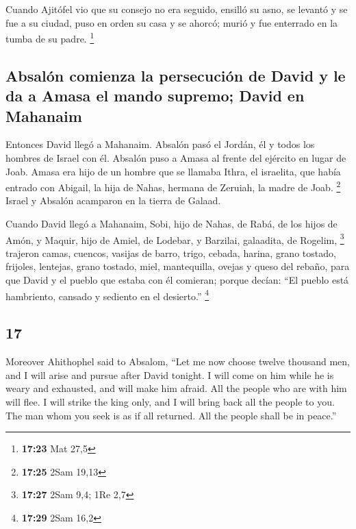\begin{paracol}{2}
 Cuando Ajitófel vio que su consejo no era seguido,
ensilló su asno, se levantó y se fue a su ciudad, puso en orden su casa
y se ahorcó; murió y fue enterrado en la tumba de su padre. \footnote{\textbf{17:23}
  Mat 27,5}

\hypertarget{absaluxf3n-comienza-la-persecuciuxf3n-de-david-y-le-da-a-amasa-el-mando-supremo-david-en-mahanaim}{%
\subsection{Absalón comienza la persecución de David y le da a Amasa el
mando supremo; David en
Mahanaim}\label{absaluxf3n-comienza-la-persecuciuxf3n-de-david-y-le-da-a-amasa-el-mando-supremo-david-en-mahanaim}}

 Entonces David llegó a Mahanaim. Absalón pasó el Jordán,
él y todos los hombres de Israel con él.  Absalón puso a
Amasa al frente del ejército en lugar de Joab. Amasa era hijo de un
hombre que se llamaba Ithra, el israelita, que había entrado con
Abigail, la hija de Nahas, hermana de Zeruiah, la madre de Joab.
\footnote{\textbf{17:25} 2Sam 19,13}  Israel y Absalón
acamparon en la tierra de Galaad.

 Cuando David llegó a Mahanaim, Sobi, hijo de Nahas, de
Rabá, de los hijos de Amón, y Maquir, hijo de Amiel, de Lodebar, y
Barzilai, galaadita, de Rogelim, \footnote{\textbf{17:27} 2Sam 9,4; 1Re
  2,7}  trajeron camas, cuencos, vasijas de barro, trigo,
cebada, harina, grano tostado, frijoles, lentejas, grano tostado,
 miel, mantequilla, ovejas y queso del rebaño, para que
David y el pueblo que estaba con él comieran; porque decían: ``El pueblo
está hambriento, cansado y sediento en el desierto.'' \footnote{\textbf{17:29}
  2Sam 16,2}

\switchcolumn
\begin{otherlanguage}{english}

\hypertarget{section-33}{%
\section{17}\label{section-33}}

 Moreover Ahithophel said to Absalom, ``Let me now choose
twelve thousand men, and I will arise and pursue after David tonight.
 I will come on him while he is weary and exhausted, and
will make him afraid. All the people who are with him will flee. I will
strike the king only,  and I will bring back all the
people to you. The man whom you seek is as if all returned. All the
people shall be in peace.''


\end{otherlanguage}
\end{paracol}
